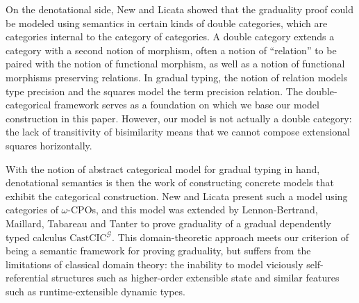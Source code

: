 On the denotational side, New and Licata \cite{new-licata18} showed that the
graduality proof could be modeled using semantics in certain kinds of double
categories, which are categories internal to the category of categories. A
double category extends a category with a second notion of morphism, often a
notion of ``relation'' to be paired with the notion of functional morphism, as
well as a notion of functional morphisms preserving relations. In gradual
typing, the notion of relation models type precision and the squares model the
term precision relation.
%
%
The double-categorical framework serves as a foundation on which we base our
model construction in this paper. However, our model is not actually a double
category: the lack of transitivity of bisimilarity means that we cannot compose
extensional squares horizontally.

With the notion of abstract categorical model for gradual typing in hand,
denotational semantics is then the work of constructing concrete models that
exhibit the categorical construction. New and Licata \cite{new-licata18} present
such a model using categories of $\omega$-CPOs, and this model was extended by
Lennon-Bertrand, Maillard, Tabareau and Tanter \cite{gradualizing-cic} to prove
graduality of a gradual dependently typed calculus $\textrm{CastCIC}^{\mathcal
G}$. This domain-theoretic approach meets our criterion of being a semantic
framework for proving graduality, but suffers from the limitations of classical
domain theory: the inability to model viciously self-referential structures such
as higher-order extensible state and similar features such as runtime-extensible
dynamic types.



